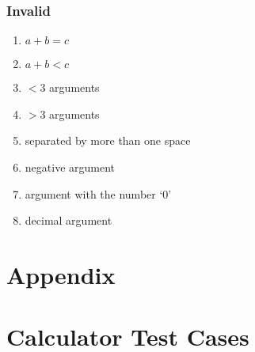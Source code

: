 \documentclass[letterpaper]{article}
\begin{document}
\subsubsection*{Invalid}
\begin{enumerate}
    \item $a + b = c$
    \item $ a + b < c$
    \item $< 3$ arguments
    \item $> 3$ arguments
    \item separated by more than one space
    \item negative argument
    \item argument with the number `0'
    \item decimal argument
\end{enumerate}





\section*{Appendix}
\appendix
\section{Calculator Test Cases}

\end{document}
